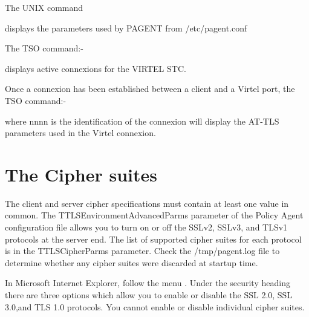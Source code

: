\documentclass[letterpaper,10pt,english]{sphinxmanual}
\begin{document}
The UNIX command

\begin{sphinxVerbatim}[commandchars=\\\{\}]
\end{sphinxVerbatim}

displays the parameters used by PAGENT from /etc/pagent.conf

The TSO command:-

\begin{sphinxVerbatim}[commandchars=\\\{\}]
 
\end{sphinxVerbatim}

displays active connexions for the VIRTEL STC.

Once a connexion has been established between a client and a Virtel port, the TSO command:-

\begin{sphinxVerbatim}[commandchars=\\\{\}]
    
\end{sphinxVerbatim}

where nnnn is the identification of the connexion will display the AT-TLS parameters used in the Virtel connexion.

\newpage

\ignorespaces 

\section{The Cipher suites}
\label{\detokenize{connectivity_guide:the-cipher-suites}}\label{\detokenize{connectivity_guide:index-160}}
The client and server cipher specifications must contain at least one value in common. The TTLSEnvironmentAdvancedParms parameter of the Policy Agent configuration file allows you to turn on or off the SSLv2, SSLv3, and TLSv1 protocols at the server end. The list of supported cipher suites for each protocol is in the TTLSCipherParms parameter. Check the /tmp/pagent.log file to determine whether any cipher suites were discarded at startup time.

In Microsoft Internet Explorer, follow the menu . Under the security heading there are three options which allow you to enable or disable the SSL 2.0, SSL 3.0,and TLS 1.0 protocols. You cannot enable or disable individual cipher suites.
\end{document}
